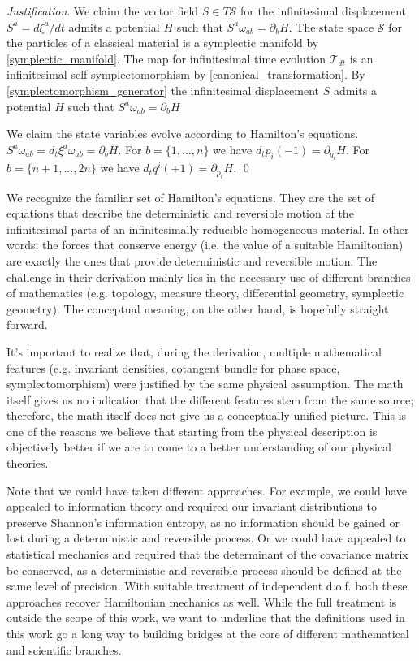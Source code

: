 \documentclass[aps,pra,10pt,twocolumn,floatfix,nofootinbib]{revtex4-1}
\numberwithin{equation}{section}
\theoremstyle{definition}
\newenvironment{justification}{\emph{Justification}.}{\qed}
\begin{document}
\begin{justification}
We claim the vector field $S \in T\mathcal{S}$ for the infinitesimal displacement $S^a = d\xi^a/dt$ admits a potential $H$ such that $S^{a} \omega_{ab} = \partial_{b}H$. The state space $\mathcal{S}$ for the particles of a classical material is a symplectic manifold by \ref{symplectic_manifold}. The map for infinitesimal time evolution $\mathcal{T}_{dt}$ is an infinitesimal self-symplectomorphism by \ref{canonical_transformation}. By \ref{symplectomorphism_generator} the infinitesimal displacement $S$ admits a potential $H$ such that $S^{a} \omega_{ab} = \partial_{b}H$

We claim the state variables evolve according to Hamilton's equations. $S^{a} \omega_{ab} = d_t\xi^a \omega_{ab} = \partial_{b}H$. For $b=\{1,...,n\}$ we have $d_tp_i (-1) = \partial_{q_i} H$. For $b=\{n+1,...,2n\}$ we have $d_tq^i (+1) = \partial_{p_i} H$.
\end{justification}

We recognize the familiar set of Hamilton's equations. They are the set of equations that describe the deterministic and reversible motion of the infinitesimal parts of an infinitesimally reducible homogeneous material. In other words: the forces that conserve energy (i.e. the value of a suitable Hamiltonian) are exactly the ones that provide deterministic and reversible motion. The challenge in their derivation mainly lies in the necessary use of different branches of mathematics (e.g. topology, measure theory, differential geometry, symplectic geometry). The conceptual meaning, on the other hand, is hopefully straight forward. 

It's important to realize that, during the derivation, multiple mathematical features (e.g. invariant densities, cotangent bundle for phase space, symplectomorphism) were justified by the same physical assumption. The math itself gives us no indication that the different features stem from the same source; therefore, the math itself does not give us a conceptually unified picture. This is one of the reasons we believe that starting from the physical description is objectively better if we are to come to a better understanding of our physical theories.

Note that we could have taken different approaches. For example, we could have appealed to information theory and required our invariant distributions to preserve Shannon's information entropy, as no information should be gained or lost during a deterministic and reversible process. Or we could have appealed to statistical mechanics and required that the determinant of the covariance matrix be conserved, as a deterministic and reversible process should be defined at the same level of precision. With suitable treatment of independent d.o.f. both these approaches recover Hamiltonian mechanics as well. While the full treatment is outside the scope of this work, we want to underline that the definitions used in this work go a long way to building bridges at the core of different mathematical and scientific branches.
\end{document}
